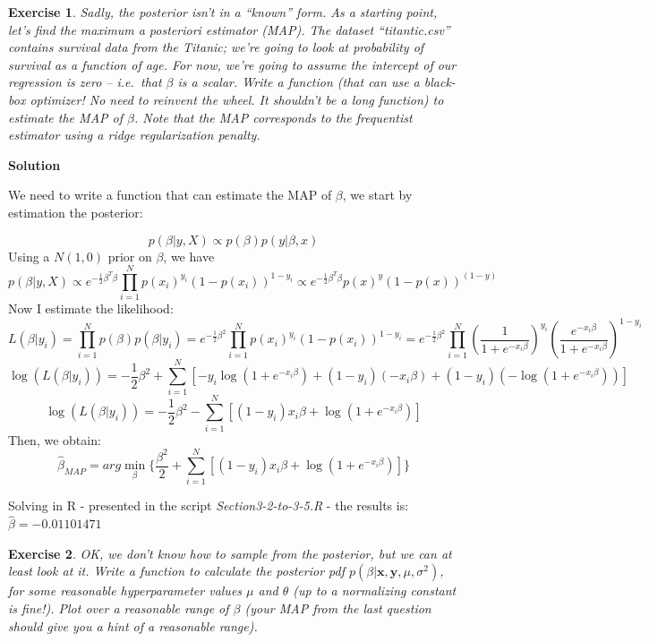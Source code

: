 \documentclass[twoside]{article}
\newcounter{lecnum}
\newtheorem{exercise}{Exercise}[lecnum]
\begin{document}
\begin{exercise}
  Sadly, the posterior isn't in a ``known'' form. As a starting point, let's find the maximum a posteriori estimator (MAP). The dataset ``titantic.csv'' contains survival data from the Titanic; we're going to look at probability of survival as a function of age. For now, we're going to assume the intercept of our regression is zero -- i.e.\ that $\beta$ is a scalar.  Write a function (that can use a black-box optimizer! No need to reinvent the wheel. It shouldn't be a long function) to estimate the MAP of $\beta$. Note that the MAP corresponds to the frequentist estimator using a ridge regularization penalty.
\end{exercise}

{\color{blue}
	\textbf{Solution}
	
	We need to write a function that can estimate the MAP of $\beta$, we start by estimation the posterior:
	
	$$ p(\beta| y, X) \propto p(\beta)p(y|\beta,x) $$
	Using a $N(1, 0)$ prior on $\beta$, we have
	$$
	p(\beta| y, X) \propto  e^{-\frac{1}{2}\beta ^T\beta}
	\prod_{i=1}^{N} p(x_i)^{y_i}(1-p(x_i))^{1-y_i} 
	\propto  e^{-\frac{1}{2}\beta ^T\beta} p(x)^y(1-p(x))^{(1-y)} $$
	Now I estimate the likelihood:
	$$
	L(\beta| y_i)  = \prod_{i=1}^{N} p(\beta)p(\beta| y_i)  =  
	e^{-\frac{1}{2}\beta^2}\prod_{i=1}^{N} p(x_i)^{y_i}(1-p(x_i))^{1-y_i} = 
	e^{-\frac{1}{2}\beta^2} \prod_{i=1}^{N} \left( \frac{1}{1+e^{-x_i\beta}} \right)^{y_i}
	\left( \frac{e^{-x_i\beta}}{1+e^{-x_i\beta}} \right)^{1-y_i}
	$$
	$$
	\log(L(\beta| y_i)) = -\frac{1}{2}\beta^2 + \sum^{N}_{i=1} \left[ - y_i \log(1+e^{-x_i\beta}) + (1-y_i) (- x_i\beta) + (1-y_i)(-\log(1+e^{-x_i\beta})) \right] 
	$$ $$
	\log(L(\beta| y_i)) = -\frac{1}{2}\beta^2 - \sum^{N}_{i=1} \left[  (1-y_i) x_i\beta + \log(1+e^{-x_i\beta}) \right] $$
	Then, we obtain: 	
	$$	\hat{\beta}_{MAP} = arg \min_{\beta} \bigg\{ 
	\frac{\beta^2}{2} + 
	 \sum^{N}_{i=1} \left[  (1-y_i) x_i\beta + \log(1+e^{-x_i\beta}) \right]  \bigg\} 
	$$
	
	Solving in R - presented in the script \textit{Section3-2-to-3-5.R} - the results is: $\hat{\beta} = -0.01101471 $
	
	
	
} %
\begin{exercise}
  OK, we don't know how to sample from the posterior, but we can at least look at it. Write a function to calculate the posterior pdf $p(\beta|\mathbf{x},\mathbf{y},\mu,\sigma^2)$, for some reasonable hyperparameter values $\mu$ and $\theta$ (up to a normalizing constant is fine!). Plot over a reasonable range of $\beta$ (your MAP from the last question should give you a hint of a reasonable range).
\end{exercise}
\end{document}
